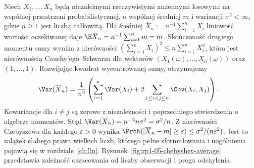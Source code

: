 \begin{przyklad}
Niech $X_1,\ldots,X_n$ będą niezależnymi rzeczywistymi
zmiennymi losowymi na wspólnej przestrzeni probabilistycznej,
o wspólnej średniej $m$ i wariancji $\sigma^2<\infty$,
gdzie $n\geq1$ jest liczbą całkowitą.
Dla średniej $\overline X_n:=n^{-1}\sum_{i=1}^nX_i$
liniowość wartości oczekiwanej daje
$\E\overline X_n=n^{-1}\sum_{i=1}^n m=m$.
Skończoność drugiego momentu sumy wynika z nierówności
$(\sum_{i=1}^n X_i)^2\leq n\sum_{i=1}^n X_i^2$,
która jest nierównością Cauchy'ego--Schwarza dla wektorów
$(X_1(\omega),\ldots,X_n(\omega))$ oraz $(1,\ldots,1)$.
Rozwijając kwadrat wycentrowanej sumy, otrzymujemy
\[
\Var(\overline X_n)=\frac{1}{n^2}
\left(\sum_{i=1}^n\Var(X_i)+
2\sum_{1\leq i<j\leq n}\Cov(X_i,X_j)\right).
\]
Kowariancje dla $i\ne j$ są zerowe z niezależności
i poprzedniego stwierdzenia o algebrze momentów.
Stąd $\Var(\overline X_n)=n^{-2}n\sigma^2=\sigma^2/n$.
Z nierówności Czebyszewa dla każdego $\varepsilon>0$ wynika
$\Prob(|\overline X_n-m|\geq\varepsilon)
\leq\sigma^2/(n\varepsilon^2)$.
Jest to zalążek słabego prawa wielkich liczb, którego
pełne sformułowania i uogólnienia pojawią się w rozdziale~\ref{ch:lln}.
Rysunek~\ref{fig:rp1-05-chebyshev-average} przedstawia zależność oszacowania od liczby obserwacji i progu odchylenia.
\end{przyklad}

